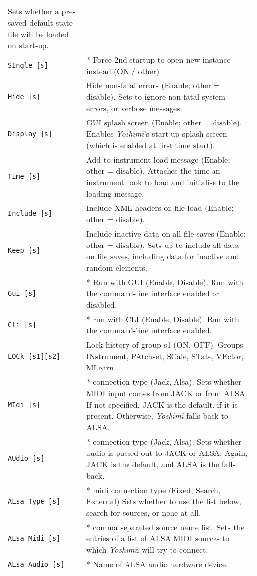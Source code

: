 \begin{center}
\begin{longtable}{p{4cm} p{10cm}}
   Sets whether a pre-saved default state file will be loaded on start-up. \\
\texttt{SIngle [s]} &
   * Force 2nd startup to open new instance instead (ON / other)\\
\texttt{Hide [s]} &
   Hide non-fatal errors (Enable; other = disable).
   Sets to ignore non-fatal system errors, or verbose messages. \\
\texttt{Display [s]} &
   GUI splash screen (Enable; other = disable).
   Enables \textsl{Yoshimi}'s start-up splash screen (which is
   enabled at first time start). \\
\texttt{Time [s]} &
   Add to instrument load message (Enable; other = disable).
   Attaches the time an instrument took to load and initialise to the loading
   message. \\
\texttt{Include [s]} &
   Include XML headers on file load (Enable; other = disable). \\
\texttt{Keep [s]} &
   Include inactive data on all file saves (Enable; other = disable).
   Sets up to include all data on file saves, including data for
   inactive and random elements. \\
\texttt{Gui [s]} &
   * Run with GUI (Enable, Disable).
   Run with the command-line interface enabled or disabled.  \\
\texttt{Cli [s]} &
   * run with CLI (Enable, Disable).
   Run with the command-line interface enabled. \\
\texttt{LOCk [s1][s2]} &
   Lock history of group s1 (ON, OFF).
   Groups - INstrument, PAtchset, SCale, STate, VEctor, MLearn. \\
\texttt{MIdi [s]} &
   * connection type (Jack, Alsa).
   Sets whether MIDI input comes from JACK or from ALSA.
   If not specified, JACK is the default, if it is present.  Otherwise,
   \textsl{Yoshimi} falls back to ALSA. \\
\texttt{AUdio [s]} &
   * connection type (Jack, Alsa).
   Sets whether audio is passed out to JACK or ALSA.  Again, JACK is the
   default, and ALSA is the fall-back.  \\
\texttt{ALsa Type [s]} &
   * midi connection type (Fixed, Search, External)
   Sets whether to use the list below, search for sources, or none at all. \\
\texttt{ALsa Midi [s]} &
   * comma separated source name list.
   Sets the entries of a list of ALSA MIDI sources to which
   \textsl{Yoshimi}i will try to connect.  \\
\texttt{ALsa Audio [s]} &
   * Name of ALSA audio hardware device.

\end{longtable}
\end{center}
